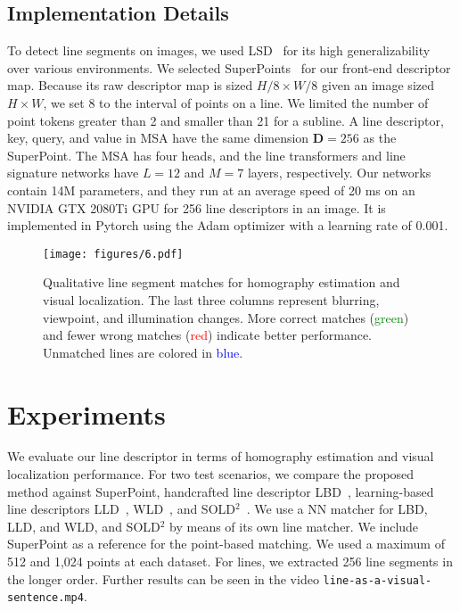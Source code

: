 \documentclass[letterpaper, 10 pt, journal, twoside]{ieeetran}
\begin{document}
\subsection{Implementation Details}

To detect line segments on images, we used \ac{LSD}~\cite{Gioi2010} for its high generalizability over various environments. We selected SuperPoints~\cite{DeTone2017} for our front-end descriptor map. Because its raw descriptor map is sized $H\slash8 \times W\slash8$ given an image sized $H \times W$, we set 8 to the interval of points on a line. We limited the number of point tokens greater than 2 and smaller than 21 for a subline. A line descriptor, key, query, and value in \ac{MSA} have the same dimension $\mathbf{D}=256$ as the SuperPoint. The \ac{MSA} has four heads, and the line transformers and line signature networks have $L=12$ and $M=7$ layers, respectively. Our networks contain 14M parameters, and they run at an average speed of 20 ms on an NVIDIA GTX 2080Ti GPU for 256 line descriptors in an image. It is implemented in Pytorch using the Adam optimizer with a learning rate of 0.001.

\begin{figure*}[!t]
	\centering
	\texttt{[image: figures/6.pdf]}
	\caption{Qualitative line segment matches for homography estimation and visual localization. The last three columns represent blurring, viewpoint, and illumination changes. More correct matches (\textcolor{green}{green}) and fewer wrong matches (\textcolor{red}{red}) indicate better performance. Unmatched lines are colored in \textcolor{blue}{blue}. }
	\label{fig:qual}
	\vspace{-5mm}
\end{figure*}




\section{Experiments}
\label{sec:exp}

We evaluate our line descriptor in terms of homography estimation and visual localization performance. For two test scenarios, we compare the proposed method against SuperPoint, handcrafted line descriptor LBD~\cite{LBD2013}, learning-based line descriptors \ac{LLD}~\cite{LLD2019}, \ac{WLD}~\cite{WLD2020}, and SOLD$^2$~\cite{Pautrat2021}. We use a \ac{NN} matcher for LBD, LLD, and WLD, and SOLD$^2$ by means of its own line matcher. We include SuperPoint as a reference for the point-based matching. We used a maximum of 512 and 1,024 points at each dataset. For lines, we extracted 256 line segments in the longer order. Further results can be seen in the video \texttt{line-as-a-visual-sentence.mp4}.
\end{document}

